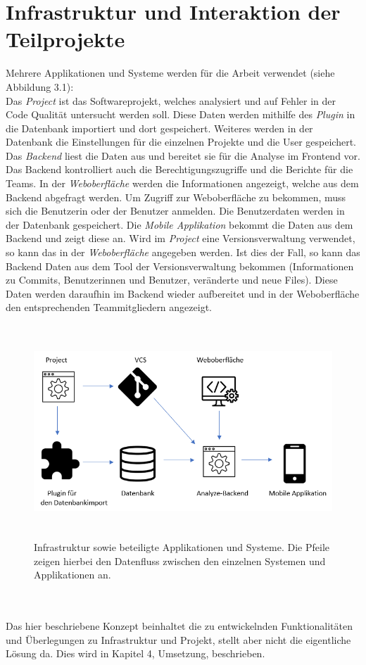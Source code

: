 \section{Infrastruktur und Interaktion der Teilprojekte}
Mehrere Applikationen und Systeme werden für die Arbeit verwendet (siehe Abbildung 3.1): \\
Das \textit{Project} ist das Softwareprojekt, welches analysiert und auf Fehler in der Code Qualität untersucht werden soll. Diese Daten werden mithilfe des \textit{Plugin} in die Datenbank importiert und dort gespeichert. Weiteres werden in der Datenbank die Einstellungen für die einzelnen Projekte und die User gespeichert. Das \textit{Backend} liest die Daten aus und bereitet sie für die Analyse im Frontend vor. Das Backend kontrolliert auch die Berechtigungszugriffe und die Berichte für die Teams. In der \textit{Weboberfläche} werden die Informationen angezeigt, welche aus dem Backend abgefragt werden. Um Zugriff zur Weboberfläche zu bekommen, muss sich die Benutzerin oder der Benutzer anmelden. Die Benutzerdaten werden in der Datenbank gespeichert.
Die \textit{Mobile Applikation} bekommt die Daten aus dem Backend und zeigt diese an. Wird im \textit{Project} eine Versionsverwaltung verwendet, so kann das in der \textit{Weboberfläche} angegeben werden. Ist dies der Fall, so kann das Backend Daten aus dem Tool der Versionsverwaltung bekommen (Informationen zu Commits, Benutzerinnen und Benutzer, veränderte und neue Files). Diese Daten werden daraufhin im Backend wieder aufbereitet und in der Weboberfläche den entsprechenden Teammitgliedern angezeigt.
\begin{figure}[tp]
  \centering
  \includegraphics[height=8cm]{images/infrastruktur.PNG}
 \caption[Infrastruktur und beteiligte Applikationen und Systeme]{Infrastruktur sowie beteiligte Applikationen und Systeme. Die Pfeile zeigen hierbei den Datenfluss zwischen den einzelnen Systemen und Applikationen an.}
  \label{fig:findingsInIDE}
\end{figure}
\\ \\ Das hier beschriebene Konzept beinhaltet die zu entwickelnden Funktionalitäten und Überlegungen zu Infrastruktur und Projekt, stellt aber nicht die eigentliche Lösung da. Dies wird in Kapitel 4, Umsetzung, beschrieben.
\chapterend